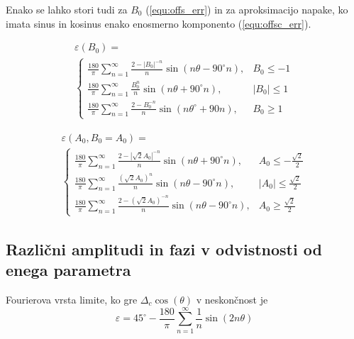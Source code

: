 \documentclass[a4paper]{article}
\begin{document}
Enako se lahko stori tudi za $B_0$ (\ref{equ:offs_err}) in za aproksimacijo napake, ko imata sinus in kosinus enako enosmerno komponento (\ref{equ:offsc_err}).

\begin{multline}
\label{equ:offs_err}
\varepsilon(B_0)=\\
\begin{cases}
\frac{180}{\pi}\sum_{n=1}^{\infty}\frac{2-|B_0|^{-n}}{n} \sin (n \theta -  90^\circ n), & B_0\leq -1 \\
\frac{180}{\pi}\sum_{n=1}^{\infty}\frac{B_0^n}{n} \sin (n \theta + 90^\circ n), & |B_0|\leq 1 \\
\frac{180}{\pi}\sum_{n=1}^{\infty}\frac{2-B_0^{-n}}{n} \sin (n \theta^\circ + 90 n), & B_0\geq 1
\end{cases}
\end{multline}

\begin{multline}
\label{equ:offsc_err}
\varepsilon(A_0,B_0=A_0)=\\
\begin{cases}
\frac{180}{\pi}\sum_{n=1}^{\infty}\frac{2-|\sqrt{2}A_0|^{-n}}{n} \sin (n \theta + 90^\circ n), & A_0\leq -\frac{\sqrt{2}}{2} \\
\frac{180}{\pi}\sum_{n=1}^{\infty}\frac{(\sqrt{2}A_0)^n}{n} \sin (n \theta - 90^\circ n), & |A_0|\leq \frac{\sqrt{2}}{2} \\
\frac{180}{\pi}\sum_{n=1}^{\infty}\frac{2-(\sqrt{2}A_0)^{-n}}{n} \sin (n \theta - 90^\circ n), & A_0\geq \frac{\sqrt{2}}{2}
\end{cases}
\end{multline}

\subsection{Različni amplitudi in fazi v odvistnosti od enega parametra}

Fourierova vrsta limite, ko gre $\Delta_c \cos(\theta)$ v neskončnost je
\begin{equation}
\label{equ:lim_dc_vrsta}
\varepsilon = 45^\circ -\frac{180}{\pi}\sum_{n=1}^{\infty}\frac{1}{n} \sin( 2 n \theta)
\end{equation}
\end{document}

